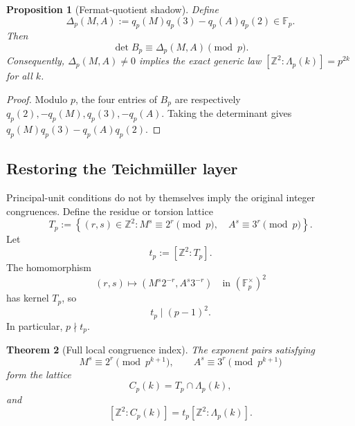 \documentclass[11pt,oneside]{article}
\newtheorem{theorem}{Theorem}[section]
\newtheorem{proposition}[theorem]{Proposition}
\theoremstyle{definition}
\newcommand{\Z}{\mathbb{Z}}
\newcommand{\F}{\mathbb{F}}
\newcommand{\set}[1]{\left\{#1\right\}}
\begin{document}
\begin{proposition}[Fermat-quotient shadow]\label{prop:fermat-shadow}
Define
\begin{equation}\label{eq:Delta-p}
  \Delta_p(M,A)
  :=q_p(M)q_p(3)-q_p(A)q_p(2)\in\F_p.
\end{equation}
Then
\begin{equation}\label{eq:det-modp}
  \det B_p\equiv\Delta_p(M,A)\pmod p.
\end{equation}
Consequently, $\Delta_p(M,A)\ne0$ implies the exact generic law
$[\Z^2:\Lambda_p(k)]=p^{2k}$ for all $k$.
\end{proposition}

\begin{proof}
Modulo $p$, the four entries of $B_p$ are respectively
$q_p(2),-q_p(M),q_p(3),-q_p(A)$.  Taking the determinant gives
$q_p(M)q_p(3)-q_p(A)q_p(2)$.
\end{proof}

\subsection{Restoring the Teichm\"uller layer}

Principal-unit conditions do not by themselves imply the original
integer congruences.  Define the residue or torsion lattice
\begin{equation}\label{eq:T-p}
  T_p:=\set{(r,s)\in\Z^2:
    M^s\equiv2^r\pmod p,\quad A^s\equiv3^r\pmod p}.
\end{equation}
Let
\begin{equation}\label{eq:t-p}
  t_p:=[\Z^2:T_p].
\end{equation}
The homomorphism
\[
  (r,s)\longmapsto(M^s2^{-r},A^s3^{-r})
  \quad\text{in }(\F_p^\times)^2
\]
has kernel $T_p$, so
\begin{equation}\label{eq:t-bound}
  t_p\mid(p-1)^2.
\end{equation}
In particular, $p\nmid t_p$.

\begin{theorem}[Full local congruence index]\label{thm:full-local-index}
The exponent pairs satisfying
\begin{equation}\label{eq:full-p-congruences}
  M^s\equiv2^r\pmod{p^{k+1}},
  \qquad
  A^s\equiv3^r\pmod{p^{k+1}}
\end{equation}
form the lattice
\begin{equation}\label{eq:Cpk}
  C_p(k)=T_p\cap\Lambda_p(k),
\end{equation}
and
\begin{equation}\label{eq:full-index-product}
  [\Z^2:C_p(k)]
  =t_p[\Z^2:\Lambda_p(k)].
\end{equation}
\end{theorem}
\end{document}
